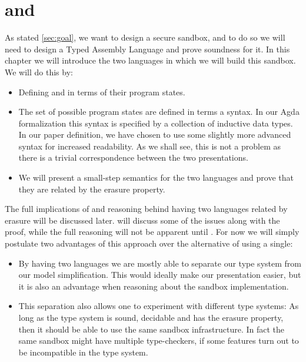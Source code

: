 \chapter{\ATAL and \ATALe}
\label{chap:lang}

As stated \cref{sec:goal}, we want to design a secure sandbox, and to do so we
will need to design a Typed Assembly Language and prove soundness for it. In
this chapter we will introduce the two languages in which we will build this
sandbox. We will do this by:

\begin{itemize}
\item Defining \ATAL and \ATALe in terms of their program states.
\item The set of possible program states are defined in terms a syntax. In our
  Agda formalization this syntax is specified by a collection of inductive data
  types. In our paper definition, we have chosen to use some slightly more
  advanced syntax for increased readability. As we shall see, this is not a
  problem as there is a trivial correspondence between the two presentations.
\item We will present a small-step semantics for the two languages and prove
  that they are related by the erasure property.
\end{itemize}

The full implications of and reasoning behind having two languages related by
erasure will be discussed later.  will discuss some of the
issues along with the proof, while the full reasoning will not be apparent until
. For now we will simply postulate two advantages of this
approach over the alternative of using a single:

\begin{itemize}
\item By having two languages we are mostly able to separate our type system
  from our model simplification. This would ideally make our presentation
  easier, but it is also an advantage when reasoning about the sandbox
  implementation.
\item This separation also allows one to experiment with different type systems:
  As long as the type system is sound, decidable and has the erasure property,
  then it should be able to use the same sandbox infrastructure. In fact the
  same sandbox might have multiple type-checkers, if some features turn out to
  be incompatible in the type system.
\end{itemize}

